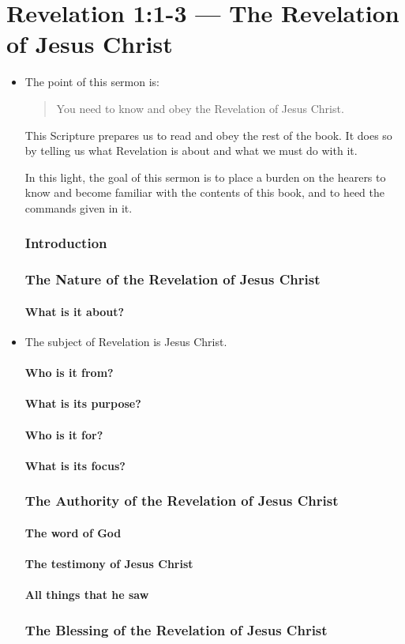 \documentclass{article}
\newcommand{\BI}{\begin{itemize}}
\newcommand{\EI}{\end{itemize}}
\newcommand{\I}{\item}
\begin{document}
\part*{Revelation 1:1-3 --- The Revelation of Jesus Christ}
\BI
\section*{Notes}
\I  The point of this sermon is:
        \begin{quote} 
        You need to know and obey the Revelation of Jesus Christ.
        \end{quote}

This Scripture prepares us to read and obey the rest of the book.
It does so by telling us what Revelation is about
    and what we must do with it.
    
In this light, the goal of this sermon is to place a burden on the hearers 
    to know and become familiar with the contents of this book, 
    and to heed the commands given in it.

\section*{Introduction}
\section{The Nature of the Revelation of Jesus Christ}
\subsection{What is it about?}
\I The subject of Revelation is Jesus Christ.
\subsection{Who is it from?}
\subsection{What is its purpose?}
\subsection{Who is it for?}
\subsection{What is its focus?}

\section{The Authority of the Revelation of Jesus Christ}
\subsection{The word of God}
\subsection{The testimony of Jesus Christ}
\subsection{All things that he saw}

\section{The Blessing of the Revelation of Jesus Christ}
\EI
\end{document}
